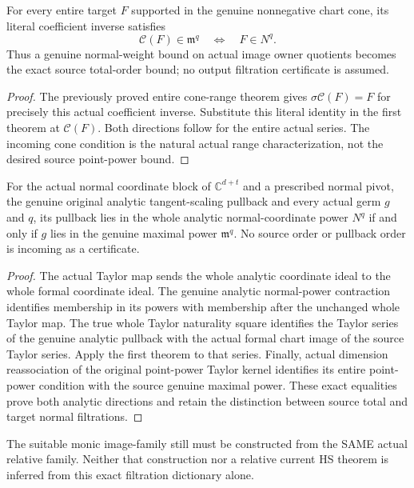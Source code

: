 \begin{theorem}
\label{hir:actual-tangent-scaling-cone-inverse-filtration}
\leanok
For every entire target $F$ supported in the genuine nonnegative chart cone,
its literal coefficient inverse satisfies
\[
 \mathcal C(F)\in\mathfrak m^q\quad\Longleftrightarrow\quad F\in N^q.
\]
Thus a genuine normal-weight bound on actual image owner quotients becomes
the exact source total-order bound; no output filtration certificate is assumed.
\end{theorem}
\begin{proof}
The previously proved entire cone-range theorem gives
$\sigma\mathcal C(F)=F$ for precisely this actual coefficient inverse.
Substitute this literal identity in the first theorem at $\mathcal C(F)$.
Both directions follow for the entire actual series. The incoming cone
condition is the natural actual range characterization, not the desired
source point-power bound.
\end{proof}

\begin{theorem}
\label{hir:actual-tangent-scaling-analytic-filtration}
\leanok
For the actual normal coordinate block of $\mathbb C^{d+t}$ and a prescribed normal pivot, the genuine original analytic tangent-scaling pullback and every actual
germ $g$ and $q$, its pullback lies in the whole analytic normal-coordinate
power $N^q$ if and only if $g$ lies in the genuine maximal power
$\mathfrak m^q$. No source order or pullback order is incoming as a certificate.
\end{theorem}
\begin{proof}
The actual Taylor map sends the whole analytic coordinate ideal to the whole
formal coordinate ideal. The genuine analytic normal-power contraction
identifies membership in its powers with membership after the unchanged
whole Taylor map. The true whole Taylor naturality square identifies the
Taylor series of the genuine analytic pullback with the actual formal chart
image of the source Taylor series. Apply the first theorem to that series.
Finally, actual dimension reassociation of the original point-power Taylor
kernel identifies its entire point-power condition with the source genuine
maximal power. These exact equalities prove both analytic directions and
retain the distinction between source total and target normal filtrations.
\end{proof}

The suitable monic image-family still must be constructed from the SAME actual
relative family. Neither that construction nor a relative current HS theorem
is inferred from this exact filtration dictionary alone.
